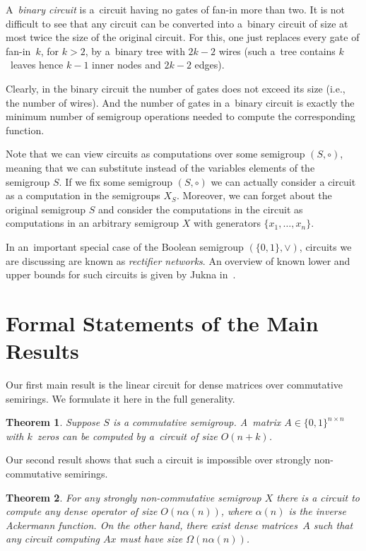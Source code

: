 \documentclass[11pt,letterpaper]{article}
\newtheorem{theorem}{Theorem}
\begin{document}
A~{\em binary circuit} is a~circuit having no gates of fan-in more than two. It
is not difficult to see that any circuit can be converted into a~binary circuit
of size at most twice the size of the original circuit. For this, one just
replaces every gate of fan-in~$k$, for $k>2$, by a~binary tree with $2k-2$ wires
(such a~tree contains $k$~leaves hence $k-1$ inner nodes and $2k-2$ edges).

Clearly, in the binary circuit the number of gates does not exceed its size
(i.e., the number of wires). And the number of gates in a~binary circuit is
exactly the minimum number of semigroup operations needed to compute the
corresponding function.

Note that we can view circuits as computations over some semigroup $(S,\circ)$,
meaning that we can substitute instead of the variables elements of the
semigroup $S$. If we fix some semigroup $(S,\circ)$ we can actually consider a
circuit as a computation in the semigroups $X_S$. Moreover, we can forget about
the original semigroup $S$ and consider the computations in the circuit as
computations in an arbitrary semigroup $X$ with generators
$\{x_1, \ldots, x_n\}$.

In an~important special case of the Boolean semigroup $(\{0,1\}, \lor)$,
circuits we are discussing are known as {\em rectifier networks}. An overview of
known lower and upper bounds for such circuits is given by Jukna
in~\cite[Section~13.6]{DBLP:books/daglib/0028687}.

\section{Formal Statements of the Main Results} \label{sec:statement}

Our first main result is the linear circuit for dense matrices over commutative semirings. We formulate it here in the full generality.

\begin{theorem}\label{thm:main_statement}
Suppose $S$ is a commutative semigroup. A~matrix $A \in \{0,1\}^{n \times n}$
with $k$~zeros can be computed by a~circuit of size $O(n+k)$.
\end{theorem}


Our second result shows that such a circuit is impossible over strongly non-commutative semirings.

\begin{theorem}\label{thm:noncommlowerbound_statement}
For any strongly non-commutative semigroup $X$ there is a circuit to compute any dense operator of size $O(n\alpha(n))$, where $\alpha(n)$ is the inverse Ackermann function. On the other hand, there exist dense matrices~$A$ such that any circuit computing $Ax$ must have size $\Omega(n\alpha(n))$.
\end{theorem}
\end{document}

